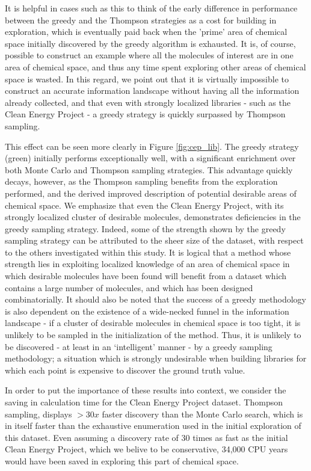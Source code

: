 It is helpful in cases such as this to think of the early difference in performance between the greedy and the Thompson strategies as a cost for building in exploration, which is eventually paid back when the 'prime' area of chemical space initially discovered by the greedy algorithm is exhausted.  It is, of course, possible to construct an example where all the molecules of interest are in one area of chemical space, and thus any time spent exploring other areas of chemical space is wasted.  In this regard, we point out that it is virtually impossible to construct an accurate information landscape without having all the information already collected, and that even with strongly localized libraries - such as the Clean Energy Project - a greedy strategy is quickly surpassed by Thompson sampling. 
  

This effect can be seen more clearly in Figure \ref{fig:cep_lib}.  The greedy strategy (green) initially performs exceptionally well, with a significant enrichment over both Monte Carlo and Thompson sampling strategies.  This advantage quickly decays, however, as the Thompson sampling benefits from the exploration performed, and the derived improved description of potential desirable areas of chemical space. We emphasize that even the Clean Energy Project, with its strongly localized cluster of desirable molecules, demonstrates deficiencies in the greedy sampling strategy.  Indeed, some of the strength shown by the greedy sampling strategy can be attributed to the sheer size of the dataset, with respect to the others investigated within this study.  It is logical that a method whose strength lies in exploiting localized knowledge of an area of chemical space in which desirable molecules have been found will benefit from a dataset which contains a large number of molecules, and which has been designed combinatorially. It should also be noted that the success of a greedy methodology is also dependent on the existence of a wide-necked funnel in the information landscape - if a cluster of desirable molecules in chemical space is too tight, it is unlikely to be sampled in the initialization of the method.  Thus, it is unlikely to be discovered - at least in an `intelligent' manner - by a greedy sampling methodology; a situation which is strongly undesirable when building libraries for which each point is expensive to discover the ground truth value.
  
In order to put the importance of these results into context, we consider the saving in calculation time for the Clean Energy Project dataset. Thompson sampling, displays $>30x$ faster discovery than the Monte Carlo search, which is in itself faster than the exhaustive enumeration used in the initial exploration of this dataset. Even assuming a discovery rate of 30 times as fast as the initial Clean Energy Project, which we belive to be conservative, 34,000 CPU years would have been saved in exploring this part of chemical space.  

